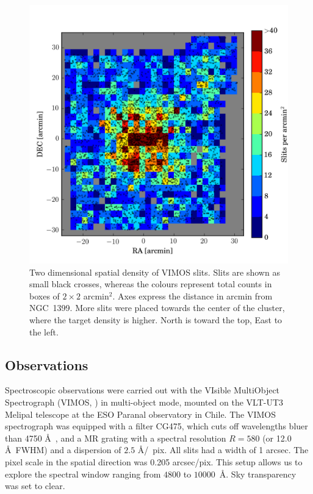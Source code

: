 \documentclass[useAMS,usenatbib]{mn2e}
\begin{document}

\begin{figure}
\centering
\includegraphics[width=\columnwidth]{figures/slitdist.png} 
\caption{Two dimensional spatial density of VIMOS slits. Slits are shown as small black crosses, whereas the colours represent total counts in boxes of $2\times2$ arcmin$^2$. Axes express the distance in arcmin from NGC~1399. More slits were placed towards the center of the cluster, where the target density is higher. North is toward the top, East to the left.}
\label{fig:2dsplit}
\end{figure}

\subsection{Observations}
\label{sec:observations}

Spectroscopic observations were carried out with the VIsible MultiObject Spectrograph (VIMOS, \citealt{LeFevre}) in multi-object mode, mounted on the VLT-UT3 Melipal telescope at the ESO Paranal observatory in Chile. 
The VIMOS spectrograph was equipped with a filter CG475, which cuts off wavelengths bluer than 4750 \AA\ , and a MR grating with a spectral resolution $R = 580$ (or 12.0 \AA\ FWHM) 
and a dispersion of $2.5$ \AA /~pix. All slits had a width of 1 arcsec. The pixel scale in the spatial direction was 0.205 arcsec/pix. This setup allows us to explore the spectral window ranging from $4800$ to $10000$~\AA. Sky transparency was set to clear.
\end{document}
